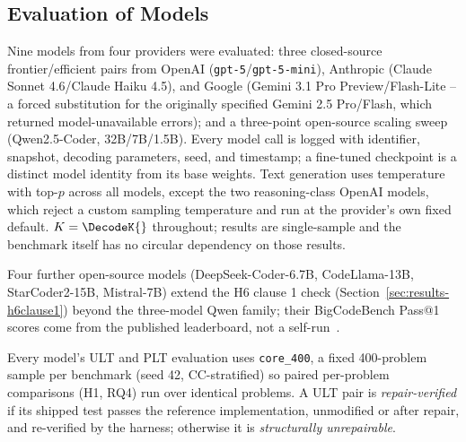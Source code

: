 \subsection{Evaluation of Models}
\label{sec:methods-models}
Nine models from four providers were evaluated: three closed-source frontier/efficient pairs from OpenAI (\texttt{gpt-5}/\texttt{gpt-5-mini}), Anthropic (Claude Sonnet 4.6/Claude Haiku 4.5), and Google (Gemini 3.1 Pro Preview/Flash-Lite -- a forced substitution for the originally specified Gemini 2.5 Pro/Flash, which returned model-unavailable errors); and a three-point open-source scaling sweep (Qwen2.5-Coder, 32B/7B/1.5B). Every model call is logged with identifier, snapshot, decoding parameters, seed, and timestamp; a fine-tuned checkpoint is a distinct model identity from its base weights. Text generation uses temperature \DecodeTemperature{} with top-$p$ \DecodeTopP{} across all models, except the two reasoning-class OpenAI models, which reject a custom sampling temperature and run at the provider's own fixed default. $K=\DecodeK{}$ throughout; results are single-sample and the benchmark itself has no circular dependency on those results. %

Four further open-source models (DeepSeek-Coder-6.7B, CodeLlama-13B, StarCoder2-15B, Mistral-7B) extend the H6 clause 1 check (Section~\ref{sec:results-h6clause1}) beyond the three-model Qwen family; their BigCodeBench Pass@1 scores come from the published leaderboard, not a self-run~\cite{zhuo2025bigcodebench}. %

Every model's ULT and PLT evaluation uses \texttt{core\_400}, a fixed 400-problem sample per benchmark (seed 42, CC-stratified) so paired per-problem comparisons (H1, RQ4) run over identical problems. A ULT pair is \emph{repair-verified} if its shipped test passes the reference implementation, unmodified or after repair, and re-verified by the harness; otherwise it is \emph{structurally unrepairable}.

